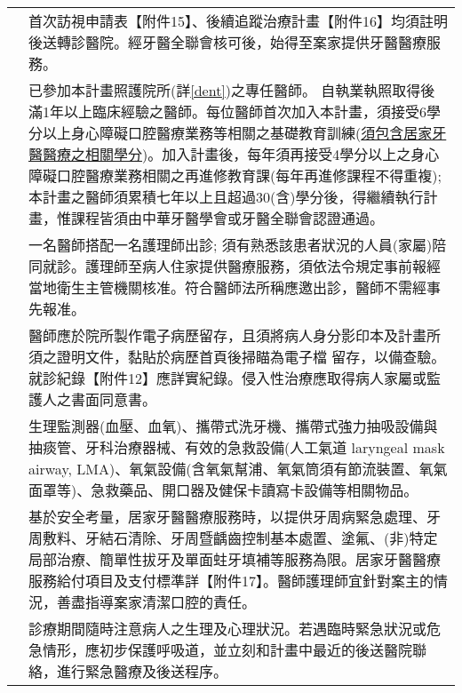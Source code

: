 \begin{longtable}{p{1.3in}p{4.8in}}

\color{OliveGreen}{事前申請}
 & 首次訪視申請表【附件15】、後續追蹤治療計畫【附件16】均須註明後送轉診醫院。經牙醫全聯會核可後，始得至案家提供牙醫醫療服務。 \\
 
\color{OliveGreen}{醫師資格}
& 已參加本計畫照護院所(詳\ref{dent})之專任醫師。
自執業執照取得後滿1年以上臨床經驗之醫師。每位醫師首次加入本計畫，須接受6學分以上身心障礙口腔醫療業務等相關之基礎教育訓練(\underline{須包含居家牙醫醫療之相關學分})。加入計畫後，每年須再接受4學分以上之身心障礙口腔醫療業務相關之再進修教育課(每年再進修課程不得重複);本計畫之醫師須累積七年以上且超過30(含)學分後，得繼續執行計畫，惟課程皆須由中華牙醫學會或牙醫全聯會認證通過。 \\

\color{OliveGreen}{到宅小組}
 & 一名醫師搭配一名護理師出診; 須有熟悉該患者狀況的人員(家屬)陪同就診。護理師至病人住家提供醫療服務，須依法令規定事前報經當地衛生主管機關核准。符合醫師法所稱應邀出診，醫師不需經事先報准。\\
 
\color{OliveGreen}{就診文書}
& 醫師應於院所製作電子病歷留存，且須將病人身分影印本及計畫所須之證明文件，黏貼於病歷首頁後掃瞄為電子檔 留存，以備查驗。就診紀錄【附件12】應詳實紀錄。侵入性治療應取得病人家屬或監護人之書面同意書。\\
 
\color{OliveGreen}{攜帶設備}
& 生理監測器(血壓、血氧)、攜帶式洗牙機、攜帶式強力抽吸設備與抽痰管、牙科治療器械、有效的急救設備(人工氣道 laryngeal mask airway, LMA)、氧氣設備(含氧氣幫浦、氧氣筒須有節流裝置、氧氣面罩等)、急救藥品、開口器及健保卡讀寫卡設備等相關物品。\\

\color{OliveGreen}{照護內容}
& 基於安全考量，居家牙醫醫療服務時，以提供牙周病緊急處理、牙周敷料、牙結石清除、牙周暨齲齒控制基本處置、塗氟、(非)特定局部治療、簡單性拔牙及單面蛀牙填補等服務為限。居家牙醫醫療服務給付項目及支付標準詳【附件17】。醫師護理師宜針對案主的情況，善盡指導案家清潔口腔的責任。\\

\color{OliveGreen}{病人安全}
& 診療期間隨時注意病人之生理及心理狀況。若遇臨時緊急狀況或危急情形，應初步保護呼吸道，並立刻和計畫中最近的後送醫院聯絡，進行緊急醫療及後送程序。\\



\end{longtable}
